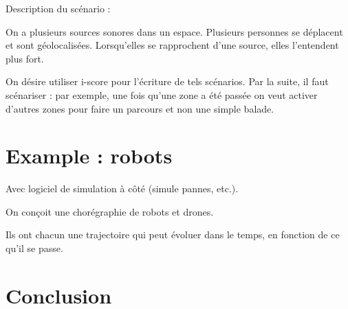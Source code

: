 \documentclass[french]{article}
\begin{document}
Description du scénario : 

On a plusieurs sources sonores dans un espace.
Plusieurs personnes se déplacent et sont géolocalisées.
Lorsqu'elles se rapprochent d'une source, elles l'entendent plus fort.

On désire utiliser i-score pour l'écriture de tels scénarios.
Par la suite, il faut scénariser : par exemple, 
une fois qu'une zone a été passée on veut activer d'autres zones pour 
faire un parcours et non une simple balade.
\section{Example : robots}
Avec logiciel de simulation à côté (simule pannes, etc.).

On conçoit une chorégraphie de robots et drones.

Ils ont chacun une trajectoire qui peut évoluer dans le temps, en fonction de ce qu'il se passe.
\section{Conclusion}
\end{document}
